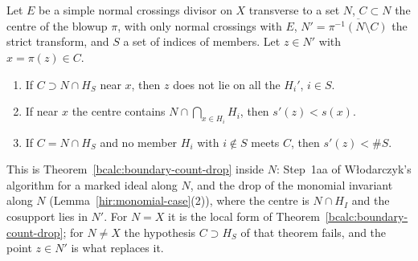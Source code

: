 \begin{theorem}
\label{bcalc:boundary-count-drop-along}
\mixedleanok
Let \(E\) be a simple normal crossings divisor on \(X\) transverse to a set \(N\), \(C\subset N\) the centre of the blowup \(\pi\), with only normal
crossings with \(E\), \(N'=\overline{\pi^{-1}(N\setminus C)}\) the strict transform, and \(S\) a set of indices of members. Let \(z\in N'\) with
\(x=\pi(z)\in C\).
\begin{enumerate}
\item If \(C\supset N\cap H_S\) near \(x\), then \(z\) does not lie on all the \(H_i'\), \(i\in S\).
\item If near \(x\) the centre contains \(N\cap\bigcap_{x\in H_i}H_i\), then \(s'(z)<s(x)\).
\item If \(C=N\cap H_S\) and no member \(H_i\) with \(i\notin S\) meets \(C\), then \(s'(z)<\#S\).
\end{enumerate}
This is Theorem~\ref{bcalc:boundary-count-drop} inside \(N\): Step~1aa of Włodarczyk's algorithm for a marked ideal along \(N\), and the
drop of the monomial invariant along \(N\) (Lemma~\ref{hir:monomial-case}(2)), where the centre is \(N\cap H_I\) and the cosupport lies in \(N'\).
For \(N=X\) it is the local form of Theorem~\ref{bcalc:boundary-count-drop}; for \(N\ne X\) the hypothesis \(C\supset H_S\) of that theorem fails, and
the point \(z\in N'\) is what replaces it.
\end{theorem}
